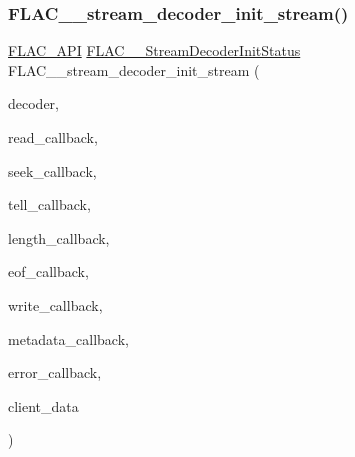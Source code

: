 \subsubsection{\texorpdfstring{F\+L\+A\+C\+\_\+\+\_\+stream\+\_\+decoder\+\_\+init\+\_\+stream()}{FLAC\_\_stream\_decoder\_init\_stream()}}
{\footnotesize\ttfamily \hyperlink{group__flac__export_ga56ca07df8a23310707732b1c0007d6f5}{F\+L\+A\+C\+\_\+\+A\+PI} \hyperlink{group__flac__stream__decoder_gaaed54a24ac6310d29c5cafba79759c44}{F\+L\+A\+C\+\_\+\+\_\+\+Stream\+Decoder\+Init\+Status} F\+L\+A\+C\+\_\+\+\_\+stream\+\_\+decoder\+\_\+init\+\_\+stream (\begin{DoxyParamCaption}\item[{\hyperlink{struct_f_l_a_c_____stream_decoder}{F\+L\+A\+C\+\_\+\+\_\+\+Stream\+Decoder} $\ast$}]{decoder,  }\item[{\hyperlink{group__flac__stream__decoder_ga25d4321dc2f122d35ddc9061f44beae7}{F\+L\+A\+C\+\_\+\+\_\+\+Stream\+Decoder\+Read\+Callback}}]{read\+\_\+callback,  }\item[{\hyperlink{group__flac__stream__decoder_ga4c18b0216e0f7a83d7e4e7001230545d}{F\+L\+A\+C\+\_\+\+\_\+\+Stream\+Decoder\+Seek\+Callback}}]{seek\+\_\+callback,  }\item[{\hyperlink{group__flac__stream__decoder_gafdf1852486617a40c285c0d76d451a5a}{F\+L\+A\+C\+\_\+\+\_\+\+Stream\+Decoder\+Tell\+Callback}}]{tell\+\_\+callback,  }\item[{\hyperlink{group__flac__stream__decoder_ga5363f3b46e3f7d6a73385f6560f7e7ef}{F\+L\+A\+C\+\_\+\+\_\+\+Stream\+Decoder\+Length\+Callback}}]{length\+\_\+callback,  }\item[{\hyperlink{group__flac__stream__decoder_ga4eac094fc609363532d90cf8374b4f7e}{F\+L\+A\+C\+\_\+\+\_\+\+Stream\+Decoder\+Eof\+Callback}}]{eof\+\_\+callback,  }\item[{\hyperlink{group__flac__stream__decoder_ga61e48dc2c0d2f6c5519290ff046874a4}{F\+L\+A\+C\+\_\+\+\_\+\+Stream\+Decoder\+Write\+Callback}}]{write\+\_\+callback,  }\item[{\hyperlink{group__flac__stream__decoder_ga6aa87c01744c1c601b7f371f627b6e14}{F\+L\+A\+C\+\_\+\+\_\+\+Stream\+Decoder\+Metadata\+Callback}}]{metadata\+\_\+callback,  }\item[{\hyperlink{group__flac__stream__decoder_gac896ee6a12668e9015fab4fbc6aae996}{F\+L\+A\+C\+\_\+\+\_\+\+Stream\+Decoder\+Error\+Callback}}]{error\+\_\+callback,  }\item[{\hyperlink{png_8h_ac9c84fa68bbad002983e35ce3663c686}{void} $\ast$}]{client\+\_\+data }\end{DoxyParamCaption})}

